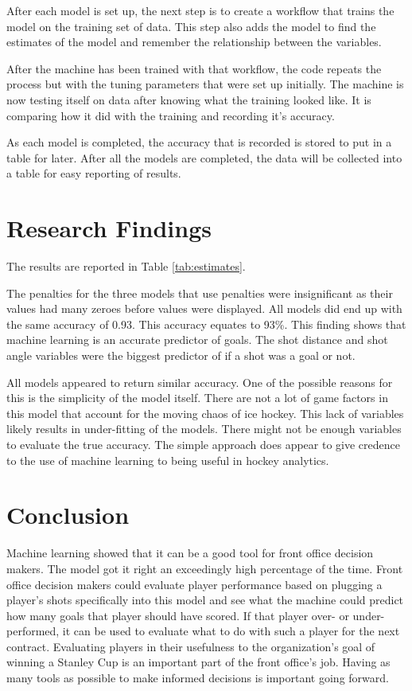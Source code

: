 \documentclass[12pt,english]{article}
\begin{document}
After each model is set up, the next step is to create a workflow that trains the model on the training set of data. This step also adds the model to find the estimates of the model and remember the relationship between the variables. 

After the machine has been trained with that workflow, the code repeats the process but with the tuning parameters that were set up initially. The machine is now testing itself on data after knowing what the training looked like. It is comparing how it did with the training and recording it's accuracy.

As each model is completed, the accuracy that is recorded is stored to put in a table for later. After all the models are completed, the data will be collected into a table for easy reporting of results. 

\section{Research Findings}\label{sec:results}
The  results are reported in Table \ref{tab:estimates}.

The penalties for the three models that use penalties were insignificant as their values had many zeroes before values were displayed. All models did end up with the same accuracy of 0.93. This accuracy equates to 93\%. This finding shows that machine learning is an accurate predictor of goals. The shot distance and shot angle variables were the biggest predictor of if a shot was a goal or not. 

All models appeared to return similar accuracy. One of the possible reasons for this is the simplicity of the model itself. There are not a lot of game factors in this model that account for the moving chaos of ice hockey. This lack of variables likely results in under-fitting of the models. There might not be enough variables to evaluate the true accuracy. The simple approach does appear to give credence to the use of machine learning to being useful in hockey analytics. 

\section{Conclusion}\label{sec:conclusion}

Machine learning showed that it can be a good tool for front office decision makers. The model got it right an exceedingly high percentage of the time. Front office decision makers could evaluate player performance based on plugging a player's shots specifically into this model and see what the machine could predict how many goals that player should have scored. If that player over- or under-performed, it can be used to evaluate what to do with such a player for the next contract. Evaluating players in their usefulness to the organization's goal of winning a Stanley Cup is an important part of the front office's job. Having as many tools as possible to make informed decisions is important going forward. 
\end{document}
